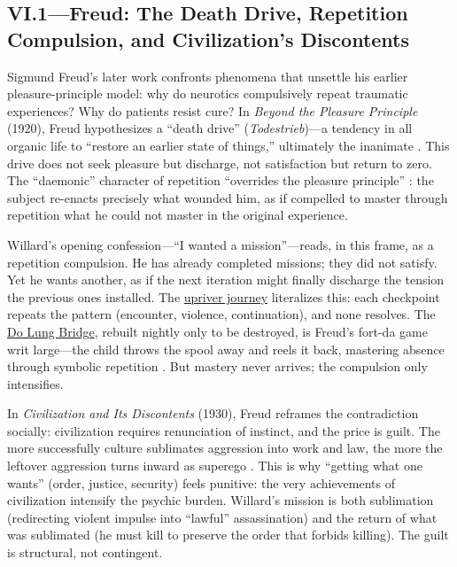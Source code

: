 \subsection*{VI.1—Freud: The Death Drive, Repetition Compulsion, and Civilization's Discontents}
\label{ssec:vi-freud}

Sigmund Freud's later work confronts phenomena that unsettle his earlier pleasure-principle
model: why do neurotics compulsively repeat traumatic experiences? Why do patients resist cure?
In \textit{Beyond the Pleasure Principle} (1920), Freud hypothesizes a ``death drive''
(\emph{Todestrieb})---a tendency in all organic life to ``restore an earlier state of things,''
ultimately the inanimate \parencite[p.~38]{FreudBeyond1955}. This drive does not seek pleasure
but discharge, not satisfaction but return to zero. The ``daemonic'' character of repetition
``overrides the pleasure principle'' \parencite[p.~22]{FreudBeyond1955}: the subject
re-enacts precisely what wounded him, as if compelled to master through repetition what he
could not master in the original experience.

Willard's opening confession---``I wanted a mission''---reads, in this frame, as a repetition
compulsion. He has already completed missions; they did not satisfy. Yet he wants another, as
if the next iteration might finally discharge the tension the previous ones installed. The
\hyperref[scene:upriver-journey]{upriver journey} literalizes this: each checkpoint repeats
the pattern (encounter, violence, continuation), and none resolves. The
\hyperref[scene:do-lung-bridge]{Do Lung Bridge}, rebuilt nightly only to be destroyed, is
Freud's fort-da game writ large---the child throws the spool away and reels it back,
mastering
absence through symbolic repetition \parencite[pp.~14--16]{FreudBeyond1955}. But mastery never
arrives; the compulsion only intensifies.

In \textit{Civilization and Its Discontents} (1930), Freud reframes the contradiction
socially: civilization requires renunciation of instinct, and the price is guilt. The more
successfully culture sublimates aggression into work and law, the more the leftover aggression
turns inward as superego \parencite[pp.~70--97]{FreudCivilization1961}. This is why ``getting
what one wants'' (order, justice, security) feels punitive: the very achievements of
civilization intensify the psychic burden. Willard's mission is both sublimation (redirecting
violent impulse into ``lawful'' assassination) and the return of what was sublimated (he must
kill to preserve the order that forbids killing). The guilt is structural, not contingent.


